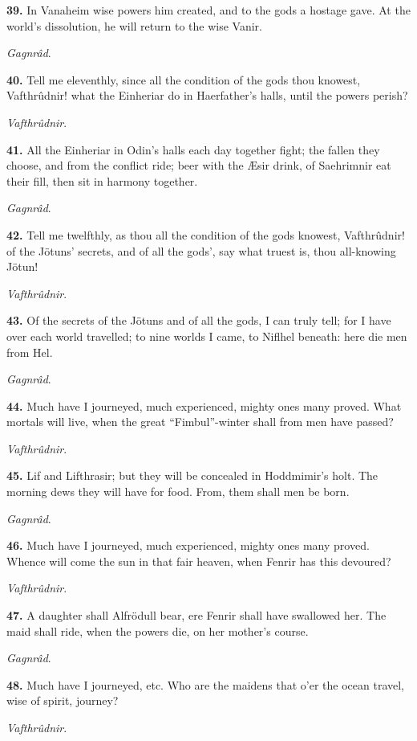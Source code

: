 \textbf{39.} In Vanaheim wise powers him created, and to the gods a hostage
gave. At the world's dissolution, he will return to the wise Vanir.

\emph{Gagnrâd}.

\textbf{40.} Tell me eleventhly, since all the condition of the gods thou
knowest, Vafthrûdnir! what the Einheriar do in Haerfather's halls,
until the powers perish?

\emph{Vafthrûdnir}.

\textbf{41.} All the Einheriar in Odin's halls each day together fight; the
fallen they choose, and from the conflict ride; beer with the Æsir
drink, of Saehrimnir eat their fill, then sit in harmony together.

\emph{Gagnrâd}.

\textbf{42.} Tell me twelfthly, as thou all the condition of the gods
knowest, Vafthrûdnir! of the Jötuns' secrets, and of all the gods',
say what truest is, thou all-knowing Jötun!

\emph{Vafthrûdnir}.

\textbf{43.} Of the secrets of the Jötuns and of all the gods, I can truly
tell; for I have over each world travelled; to nine worlds I came, to
Niflhel beneath: here die men from Hel.

\emph{Gagnrâd}.

\textbf{44.} Much have I journeyed, much experienced, mighty ones many
proved. What mortals will live, when the great ``Fimbul''-winter shall
from men have passed?

\emph{Vafthrûdnir}.

\textbf{45.} Lif and Lifthrasir; but they will be concealed in Hoddmimir's
holt. The morning dews they will have for food. From, them shall men
be born.

\emph{Gagnrâd}.

\textbf{46.} Much have I journeyed, much experienced, mighty ones many
proved. Whence will come the sun in that fair heaven, when Fenrir has
this devoured?

\emph{Vafthrûdnir}.

\textbf{47.} A daughter shall Alfrödull bear, ere Fenrir shall have swallowed
her. The maid shall ride, when the powers die, on her mother's course.

\emph{Gagnrâd}.

\textbf{48.} Much have I journeyed, etc. Who are the maidens that o'er the
ocean travel, wise of spirit, journey?

\emph{Vafthrûdnir}.

